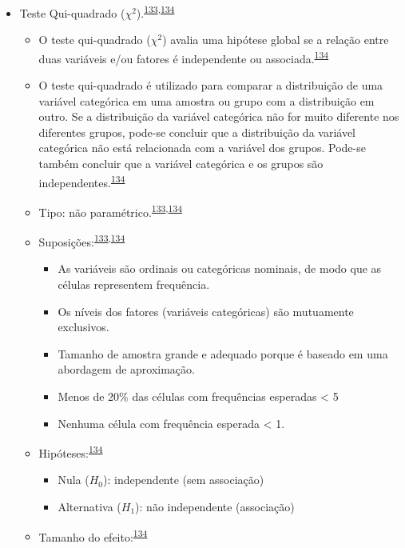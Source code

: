 \documentclass[
  a4paper,
]{book}
\begin{document}
\begin{itemize}
\item
  Teste Qui-quadrado (\(\chi^2\)).\textsuperscript{\protect\hyperlink{ref-McHugh2013}{133},\protect\hyperlink{ref-Kim2017a}{134}}

  \begin{itemize}
  \item
    O teste qui-quadrado (\(\chi^2\)) avalia uma hipótese global se a relação entre duas variáveis e/ou fatores é independente ou associada.\textsuperscript{\protect\hyperlink{ref-Kim2017a}{134}}
  \item
    O teste qui-quadrado é utilizado para comparar a distribuição de uma variável categórica em uma amostra ou grupo com a distribuição em outro. Se a distribuição da variável categórica não for muito diferente nos diferentes grupos, pode-se concluir que a distribuição da variável categórica não está relacionada com a variável dos grupos. Pode-se também concluir que a variável categórica e os grupos são independentes.\textsuperscript{\protect\hyperlink{ref-Kim2017a}{134}}
  \item
    Tipo: não paramétrico.\textsuperscript{\protect\hyperlink{ref-McHugh2013}{133},\protect\hyperlink{ref-Kim2017a}{134}}
  \item
    Suposições:\textsuperscript{\protect\hyperlink{ref-McHugh2013}{133},\protect\hyperlink{ref-Kim2017a}{134}}

    \begin{itemize}
    \item
      As variáveis são ordinais ou categóricas nominais, de modo que as células representem frequência.
    \item
      Os níveis dos fatores (variáveis categóricas) são mutuamente exclusivos.
    \item
      Tamanho de amostra grande e adequado porque é baseado em uma abordagem de aproximação.
    \item
      Menos de 20\% das células com frequências esperadas \textless{} 5
    \item
      Nenhuma célula com frequência esperada \textless{} 1.
    \end{itemize}
  \item
    Hipóteses:\textsuperscript{\protect\hyperlink{ref-Kim2017a}{134}}

    \begin{itemize}
    \item
      Nula (\(H_{0}\)): independente (sem associação)
    \item
      Alternativa (\(H_{1}\)): não independente (associação)
    \end{itemize}
  \item
    Tamanho do efeito:\textsuperscript{\protect\hyperlink{ref-Kim2017a}{134}}


\end{itemize}
\end{itemize}
\end{document}
